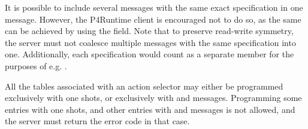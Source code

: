 \documentclass[11pt]{article}
\begin{document}
{%
It is possible to include several  messages with the same
exact  specification in one  message. However,
the P4Runtime client is encouraged not to do so, as the same can be achieved by
using the  field. Note that to preserve read-write symmetry, the server
must not coalesce multiple  messages with the same 
specification into one. Additionally, each  specification would count as
a separate member for the purposes of e.g. .%

All the tables associated with an action selector may either be programmed
exclusively with one shots, or exclusively with  and
 messages. Programming some entries with one shots, and
other entries with  and  messages is
not allowed, and the server must return the error code  in
that case.%

}
\end{document}
